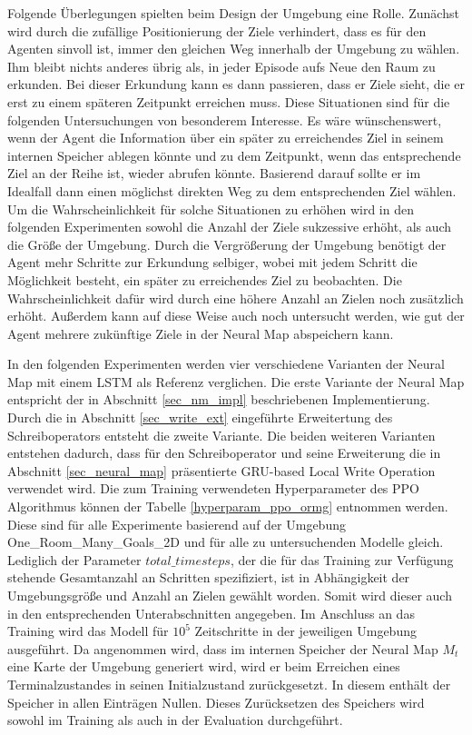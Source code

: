 Folgende Überlegungen spielten beim Design der Umgebung eine Rolle. Zunächst wird durch die zufällige Positionierung der Ziele verhindert, dass es für den Agenten sinvoll ist, immer den gleichen Weg innerhalb der Umgebung zu wählen. Ihm bleibt nichts anderes übrig als, in jeder Episode aufs Neue den Raum zu erkunden. Bei dieser Erkundung kann es dann passieren, dass er Ziele sieht, die er erst zu einem späteren Zeitpunkt erreichen muss. Diese Situationen sind für die folgenden Untersuchungen von besonderem Interesse. Es wäre wünschenswert, wenn der Agent die Information über ein später zu erreichendes Ziel in seinem internen Speicher ablegen könnte und zu dem Zeitpunkt, wenn das entsprechende Ziel an der Reihe ist, wieder abrufen könnte. Basierend darauf sollte er im Idealfall dann einen möglichst direkten Weg zu dem entsprechenden Ziel wählen. Um die Wahrscheinlichkeit für solche Situationen zu erhöhen wird in den folgenden Experimenten sowohl die Anzahl der Ziele sukzessive erhöht, als auch die Größe der Umgebung. Durch die Vergrößerung der Umgebung benötigt der Agent mehr Schritte zur Erkundung selbiger, wobei mit jedem Schritt die Möglichkeit besteht, ein später zu erreichendes Ziel zu beobachten. Die Wahrscheinlichkeit dafür wird durch eine höhere Anzahl an Zielen noch zusätzlich erhöht. Außerdem kann auf diese Weise auch noch untersucht werden, wie gut der Agent mehrere zukünftige Ziele in der Neural Map abspeichern kann.

In den folgenden Experimenten werden vier verschiedene Varianten der Neural Map mit einem LSTM als Referenz verglichen. Die erste Variante der Neural Map entspricht der in Abschnitt \ref{sec_nm_impl} beschriebenen Implementierung. Durch die in Abschnitt \ref{sec_write_ext} eingeführte Erweitertung des Schreiboperators entsteht die zweite Variante. Die beiden weiteren Varianten entstehen dadurch, dass für den Schreiboperator und seine Erweiterung die in Abschnitt \ref{sec_neural_map} präsentierte GRU-based Local Write Operation verwendet wird. Die zum Training verwendeten Hyperparameter des PPO Algorithmus können der Tabelle \ref{hyperparam_ppo_ormg} entnommen werden. Diese sind für alle Experimente basierend auf der Umgebung \glqq One\_Room\_Many\_Goals\_2D\grqq{} und für alle zu untersuchenden Modelle gleich. Lediglich der Parameter $total\_timesteps$, der die für das Training zur Verfügung stehende Gesamtanzahl an Schritten spezifiziert, ist in Abhängigkeit der Umgebungsgröße und Anzahl an Zielen gewählt worden. Somit wird dieser auch in den entsprechenden Unterabschnitten angegeben. Im Anschluss an das Training wird das Modell für $10^5$ Zeitschritte in der jeweiligen Umgebung ausgeführt. Da angenommen wird, dass im internen Speicher der Neural Map $M_t$ eine Karte der Umgebung generiert wird, wird er beim Erreichen eines Terminalzustandes in seinen Initialzustand zurückgesetzt. In diesem enthält der Speicher in allen Einträgen Nullen. Dieses Zurücksetzen des Speichers wird sowohl im Training als auch in der Evaluation durchgeführt.

